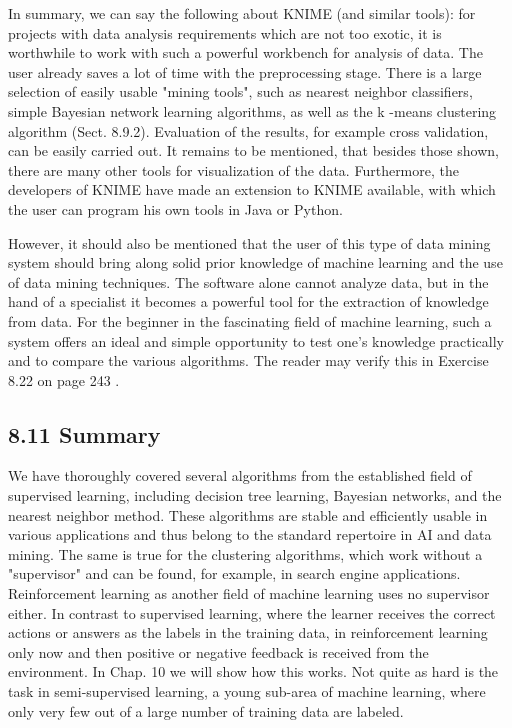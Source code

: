 \documentclass[10pt]{article}
\begin{document}
In summary, we can say the following about KNIME (and similar tools): for projects with data analysis requirements which are not too exotic, it is worthwhile to work with such a powerful workbench for analysis of data. The user already saves a lot of time with the preprocessing stage. There is a large selection of easily usable "mining tools", such as nearest neighbor classifiers, simple Bayesian network learning algorithms, as well as the k -means clustering algorithm (Sect. 8.9.2). Evaluation of the results, for example cross validation, can be easily carried out. It remains to be mentioned, that besides those shown, there are many other tools for visualization of the data. Furthermore, the developers of KNIME have made an extension to KNIME available, with which the user can program his own tools in Java or Python.

However, it should also be mentioned that the user of this type of data mining system should bring along solid prior knowledge of machine learning and the use of data mining techniques. The software alone cannot analyze data, but in the hand of a specialist it becomes a powerful tool for the extraction of knowledge from data. For the beginner in the fascinating field of machine learning, such a system offers an ideal and simple opportunity to test one's knowledge practically and to compare the various algorithms. The reader may verify this in Exercise 8.22 on page 243 .

\subsection*{8.11 Summary}
We have thoroughly covered several algorithms from the established field of supervised learning, including decision tree learning, Bayesian networks, and the nearest neighbor method. These algorithms are stable and efficiently usable in various applications and thus belong to the standard repertoire in AI and data mining. The same is true for the clustering algorithms, which work without a "supervisor" and can be found, for example, in search engine applications. Reinforcement learning as another field of machine learning uses no supervisor either. In contrast to supervised learning, where the learner receives the correct actions or answers as the labels in the training data, in reinforcement learning only now and then positive or negative feedback is received from the environment. In Chap. 10 we will show how this works. Not quite as hard is the task in semi-supervised learning, a young sub-area of machine learning, where only very few out of a large number of training data are labeled.
\end{document}
